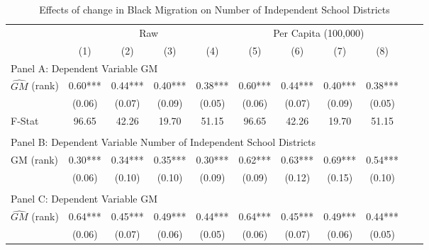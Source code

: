  \begin{table}[htbp]\centering {} \begin{threeparttable} \caption{Effects of change in Black Migration on Number of Independent School Districts} \begin{tabular}{l*{10}{c}} \toprule
                &\multicolumn{4}{c}{Raw}                                    &\multicolumn{4}{c}{Per Capita (100,000)}                   \\\cmidrule(lr){2-5}\cmidrule(lr){6-9}
                &\multicolumn{1}{c}{(1)}   &\multicolumn{1}{c}{(2)}   &\multicolumn{1}{c}{(3)}   &\multicolumn{1}{c}{(4)}   &\multicolumn{1}{c}{(5)}   &\multicolumn{1}{c}{(6)}   &\multicolumn{1}{c}{(7)}   &\multicolumn{1}{c}{(8)}   \\
\cmidrule(lr){1-9}
\multicolumn{8}{l}{Panel A: Dependent Variable GM}\\
\cmidrule(lr){1-9}
$\hat{GM}$ (rank)&       0.60***&       0.44***&       0.40***&       0.38***&       0.60***&       0.44***&       0.40***&       0.38***\\
                &     (0.06)   &     (0.07)   &     (0.09)   &     (0.05)   &     (0.06)   &     (0.07)   &     (0.09)   &     (0.05)   \\
\midrule
F-Stat          &      96.65   &      42.26   &      19.70   &      51.15   &      96.65   &      42.26   &      19.70   &      51.15   \\
\cmidrule[\heavyrulewidth](lr){1-9} \\ \cmidrule[\heavyrulewidth](lr){1-9}
\multicolumn{8}{l}{Panel B: Dependent Variable Number of Independent School Districts}\\
\cmidrule(lr){1-9}
GM  (rank)      &       0.30***&       0.34***&       0.35***&       0.30***&       0.62***&       0.63***&       0.69***&       0.54***\\
                &     (0.06)   &     (0.10)   &     (0.10)   &     (0.09)   &     (0.09)   &     (0.12)   &     (0.15)   &     (0.10)   \\
\cmidrule[\heavyrulewidth](lr){1-9} \\ \cmidrule[\heavyrulewidth](lr){1-9}
\multicolumn{8}{l}{Panel C: Dependent Variable GM}\\
\cmidrule(lr){1-9}
$\hat{GM}$ (rank)&       0.64***&       0.45***&       0.49***&       0.44***&       0.64***&       0.45***&       0.49***&       0.44***\\
                &     (0.06)   &     (0.07)   &     (0.06)   &     (0.05)   &     (0.06)   &     (0.07)   &     (0.06)   &     (0.05)   \\

\end{tabular}
\end{threeparttable}
\end{table}
